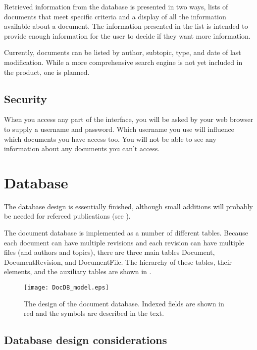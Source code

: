 \documentclass[12pt]{article}
\begin{document}
Retrieved information from the database is presented in two ways, lists of
documents that meet specific criteria and a display of all the information
available about a document. The information presented in the list is intended to
provide enough information for the user to decide if they want more information.

Currently, documents can be listed by author, subtopic, type, and date of last
modification.  While a more comprehensive search engine is not yet included in the
product, one is planned.

\subsection{Security}

When you access any part of the interface, you will be asked by your web browser
to supply a username and password. Which username you use will influence which
documents you have access too. You will not be able to see any information about
any documents you can't access.

\section{Database}

The database design is essentially finished, although small additions will
probably be needed for refereed publications (see
).

The document 
database is implemented as a number of different tables. Because each 
document can have multiple revisions and each revision can have 
multiple files (and authors and topics), there are three main tables 
Document, DocumentRevision, and DocumentFile. The hierarchy of these 
tables, their elements, and the auxiliary tables are shown in
.

\begin{figure}
\begin{center}
\texttt{[image: DocDB\_model.eps]}
\caption{The design of the document database. Indexed fields are shown in red and the
symbols are described in the text.}
\end{center}
\end{figure}

\subsection{Database design considerations}
\end{document}
